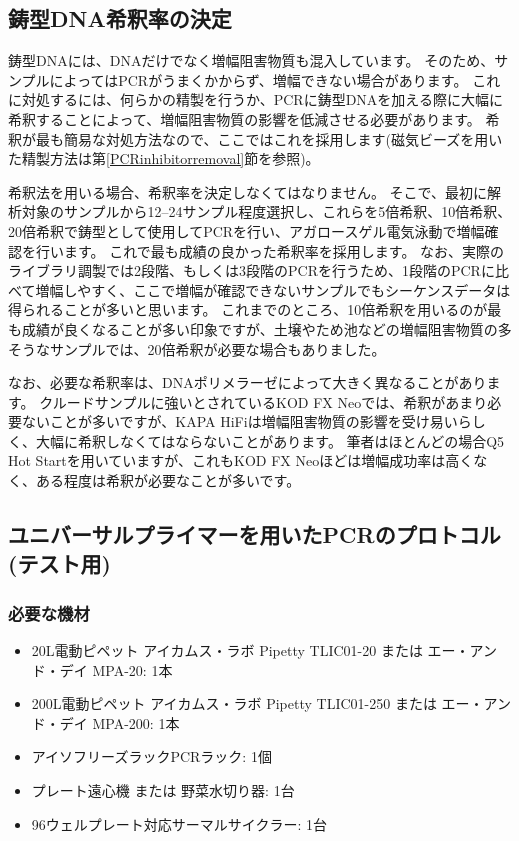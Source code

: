 \documentclass[titlepage,10pt,a4paper,uplatex]{jsbook}
\begin{document}
\subsection{鋳型DNA希釈率の決定}

鋳型DNAには、DNAだけでなく増幅阻害物質も混入しています。
そのため、サンプルによってはPCRがうまくかからず、増幅できない場合があります。
これに対処するには、何らかの精製を行うか、PCRに鋳型DNAを加える際に大幅に希釈することによって、増幅阻害物質の影響を低減させる必要があります。
希釈が最も簡易な対処方法なので、ここではこれを採用します(磁気ビーズを用いた精製方法は第\ref{PCRinhibitorremoval}節を参照)。

希釈法を用いる場合、希釈率を決定しなくてはなりません。
そこで、最初に解析対象のサンプルから12--24サンプル程度選択し、これらを5倍希釈、10倍希釈、20倍希釈で鋳型として使用してPCRを行い、アガロースゲル電気泳動で増幅確認を行います。
これで最も成績の良かった希釈率を採用します。
なお、実際のライブラリ調製では2段階、もしくは3段階のPCRを行うため、1段階のPCRに比べて増幅しやすく、ここで増幅が確認できないサンプルでもシーケンスデータは得られることが多いと思います。
これまでのところ、10倍希釈を用いるのが最も成績が良くなることが多い印象ですが、土壌やため池などの増幅阻害物質の多そうなサンプルでは、20倍希釈が必要な場合もありました。

なお、必要な希釈率は、DNAポリメラーゼによって大きく異なることがあります。
クルードサンプルに強いとされているKOD FX Neoでは、希釈があまり必要ないことが多いですが、KAPA HiFiは増幅阻害物質の影響を受け易いらしく、大幅に希釈しなくてはならないことがあります。
筆者はほとんどの場合Q5 Hot Startを用いていますが、これもKOD FX Neoほどは増幅成功率は高くなく、ある程度は希釈が必要なことが多いです。

\subsection{ユニバーサルプライマーを用いたPCRのプロトコル (テスト用)}

\subsubsection{必要な機材}
\begin{itemize}
\item 20{\textmu}L電動ピペット アイカムス・ラボ Pipetty TLIC01-20 または エー・アンド・デイ MPA-20: 1本
\item 200{\textmu}L電動ピペット アイカムス・ラボ Pipetty TLIC01-250 または エー・アンド・デイ MPA-200: 1本
\item アイソフリーズラックPCRラック: 1個
\item プレート遠心機 または 野菜水切り器: 1台
\item 96ウェルプレート対応サーマルサイクラー: 1台
\end{itemize}
\end{document}
